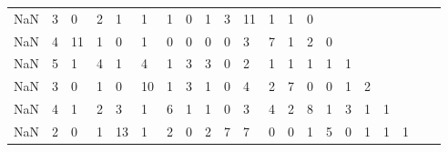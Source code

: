 \begin{table}
\begin{tabular}{lp{0.25cm}p{0.25cm}p{0.25cm}p{0.25cm}p{0.25cm}p{0.25cm}p{0.25cm}p{0.25cm}p{0.25cm}p{0.25cm}p{0.25cm}p{0.25cm}p{0.25cm}p{0.25cm}p{0.25cm}p{0.25cm}p{0.25cm}p{0.25cm}p{0.25cm}p{0.25cm}}
NaN          &   3 &  0 &  2 &  1 &  1 &  1 &  0 &  1 &  3 &  11 &   1 &   1 &   0 &     &     &     &     &     \\
NaN          &   4 & 11 &  1 &  0 &  1 &  0 &  0 &  0 &  0 &   3 &   7 &   1 &   2 &   0 &     &     &     &     \\
NaN          &   5 &  1 &  4 &  1 &  4 &  1 &  3 &  3 &  0 &   2 &   1 &   1 &   1 &   1 &   1 &     &     &     \\
NaN          &   3 &  0 &  1 &  0 & 10 &  1 &  3 &  1 &  0 &   4 &   2 &   7 &   0 &   0 &   1 &   2 &     &     \\
NaN          &   4 &  1 &  2 &  3 &  1 &  6 &  1 &  1 &  0 &   3 &   4 &   2 &   8 &   1 &   3 &   1 &   1 &     \\
NaN          &   2 &  0 &  1 & 13 &  1 &  2 &  0 &  2 &  7 &   7 &   0 &   0 &   1 &   5 &   0 &   1 &   1 &   1 \\
\bottomrule
\end{tabular}
\end{table}
